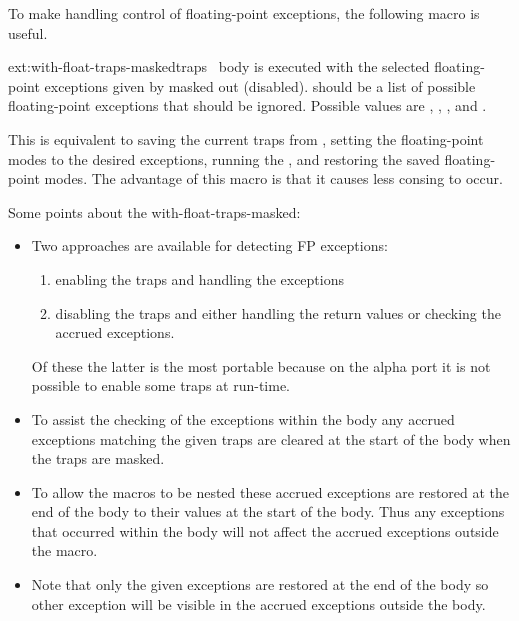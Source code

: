 To make handling control of floating-point exceptions, the following
macro is useful.

\begin{defmac}{ext:}{with-float-traps-masked}{traps \ampbody\ body}
   is executed with the selected floating-point exceptions
  given by  masked out (disabled).   should be
  a list of possible floating-point exceptions that should be ignored.
  Possible values are , , ,
   and .
  
  This is equivalent to saving the current traps from
  , setting the floating-point modes to
  the desired exceptions, running the , and restoring the
  saved floating-point modes.  The advantage of this macro is that it
  causes less consing to occur.

  Some points about the with-float-traps-masked:

  \begin{itemize}
  \item Two approaches are available for detecting FP exceptions:
    \begin{enumerate}
    \item enabling the traps and handling the exceptions
    \item disabling the traps and either handling the return values or
      checking the accrued exceptions.
    \end{enumerate}
    Of these the latter is the most portable because on the alpha port
    it is not possible to enable some traps at run-time.
    
  \item To assist the checking of the exceptions within the body any
    accrued exceptions matching the given traps are cleared at the
    start of the body when the traps are masked.
    
  \item To allow the macros to be nested these accrued exceptions are
    restored at the end of the body to their values at the start of
    the body. Thus any exceptions that occurred within the body will
    not affect the accrued exceptions outside the macro.
    
  \item Note that only the given exceptions are restored at the end of
    the body so other exception will be visible in the accrued
    exceptions outside the body.
    

\end{itemize}
\end{defmac}
